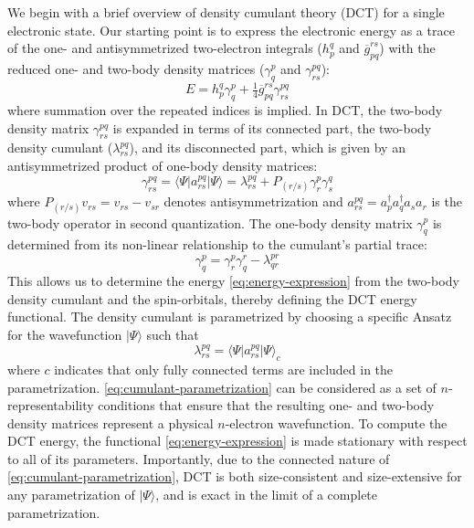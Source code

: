 We begin with a brief overview of density cumulant theory (DCT) for a single
electronic state.
Our starting point is to express the electronic energy as a trace of the one-
and antisymmetrized two-electron integrals (\( h_p^q \) and
\(\overline{g}_{pq}^{rs}\)) with the reduced one- and two-body density matrices
(\(\gamma^p_q\) and \(\gamma^{pq}_{rs}\)):
\begin{equation}
    \label{eq:energy-expression}
    E
    =
    h_p^q
    \gamma^p_q
    +
    \tfrac{1}{4}
    \overline{g}_{pq}^{rs}
    \gamma^{pq}_{rs}
\end{equation}
where summation over the repeated indices is implied.
In DCT, the two-body density matrix \(\gamma^{pq}_{rs}\) is expanded in terms of
its connected part, the two-body density cumulant ($\lambda^{pq}_{rs}$), and its
disconnected part, which is given by an antisymmetrized product of one-body
density matrices:\cite{Kutzelnigg:2006p171101}
\begin{equation}
    \label{eq:two-body-n-rep}
    \gamma^{pq}_{rs}
    =
    \langle\Psi|
    a^{pq}_{rs}
    |\Psi\rangle
    =
    \lambda^{pq}_{rs}
    +
    P_{(r/s)}
    \gamma^p_r
    \gamma^q_s
\end{equation}
where \(P_{(r/s)}v_{rs} = v_{rs} - v_{sr}\) denotes antisymmetrization and
\mbox{$a^{pq}_{rs}=a^{\dag}_{p}a^{\dag}_{q}a^{}_{s}a^{}_{r}$} is the two-body operator in second quantization.
The one-body density matrix \(\gamma^p_q\) is determined from its non-linear
relationship to the cumulant's partial trace:\cite{Sokolov:2013p024107}
\begin{equation}
    \label{eq:one-body-n-rep}
    \gamma^p_q
    =
    \gamma^p_r
    \gamma^r_q
    -
    \lambda^{pr}_{qr}
\end{equation}
This allows us to determine the energy \eqref{eq:energy-expression} from the
two-body density cumulant and the spin-orbitals, thereby defining the DCT energy
functional.
The density cumulant is parametrized by choosing a specific Ansatz for the
wavefunction \(|\Psi\rangle\) such that\cite{Sokolov:2014p074111}
\begin{equation}
    \label{eq:cumulant-parametrization}
    \lambda^{pq}_{rs}
    =
    \langle\Psi|
    a^{pq}_{rs}
    |\Psi\rangle_c
\end{equation}
where $c$ indicates that only fully connected terms are included in the
parametrization.
\cref{eq:cumulant-parametrization} can be considered as a set of
\(n\)-representability conditions that ensure that the resulting one- and
two-body density matrices represent a physical \(n\)-electron wavefunction.
To compute the DCT energy, the functional \eqref{eq:energy-expression} is made
stationary with respect to all of its parameters.
Importantly, due to the connected nature of \cref{eq:cumulant-parametrization},
DCT is both size-consistent and size-extensive for any parametrization of
\(|\Psi\rangle\), and is exact in the limit of a complete
parametrization.\cite{Sokolov:2014p074111}

